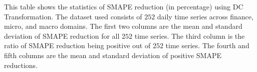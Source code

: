 \begin{center}
    \begin{table}
        \caption{Statistics of SMAPE reduction (\%) using DCT (daily cross-domain)}
        {\raggedright \footnotesize This table shows the statistics of SMAPE reduction (in percentage) using DC Transformation. The dataset used consists of $252$ daily time series across finance, micro, and macro domains. The first two columns are the mean and standard deviation of SMAPE reduction for all $252$ time series. The third column is the ratio of SMAPE reduction being positive out of $252$ time series. The fourth and fifth columns are the mean and standard deviation of positive SMAPE reductions. \par}
        \label{tbl: daily smape reduction}
    \end{table}
\end{center}

